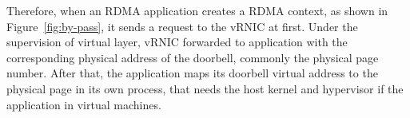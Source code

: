 Therefore, when an RDMA application creates a RDMA context, as shown in Figure~\ref{fig:by-pass}, it sends a request to the vRNIC at first. Under the supervision of virtual layer, vRNIC forwarded to application with the corresponding physical address of the doorbell, commonly the physical page number. After that, the application maps its doorbell virtual address to the physical page in its own process, that needs the host kernel and hypervisor if the application in virtual machines.

